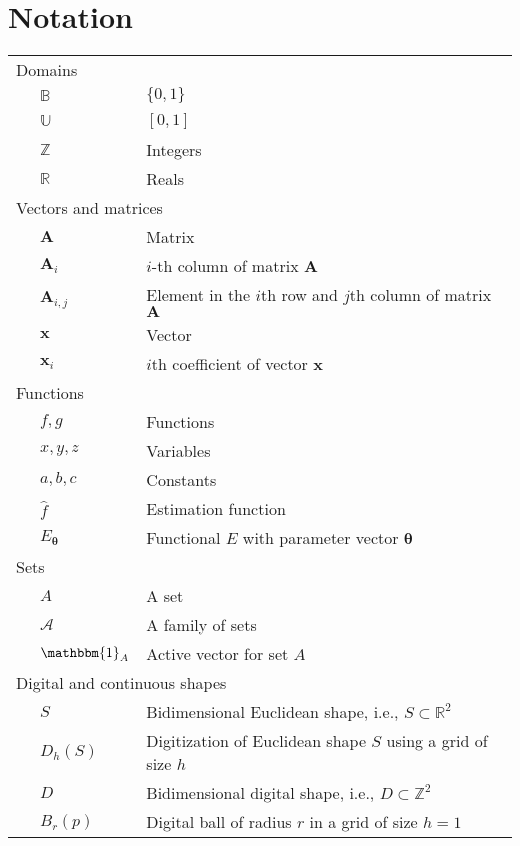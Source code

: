 \chapter{Notation}
\label{chapternotation}

\begin{longtable}{p{0.5cm}ll}
\multicolumn{3}{l}{Domains}\\
& $\mathbb{B}$ & $\{0,1\}$\\\
& $\mathbb{U}$ & $[0,1]$\\
& $\mathbb{Z}$ & Integers\\
& $\mathbb{R}$ & Reals\\[1em]

\multicolumn{3}{l}{Vectors and matrices}\\
& $\mathbf{A}$ & Matrix\\
& $\mathbf{A}_i$ & $i$-th column of matrix $\mathbf{A}$\\
& $\mathbf{A}_{i,j}$ & Element in the $i$th row and $j$th column of matrix $\mathbf{A}$\\
& $\mathbf{x}$ & Vector\\
& $\mathbf{x}_i$ & $i$th coefficient of vector $\mathbf{x}$\\[1em]

\multicolumn{3}{l}{Functions}\\
& $f,g$ & Functions\\
& $x,y,z$ & Variables \\
& $a,b,c$ & Constants \\
& $\hat{f}$ & Estimation function\\
& $E_{\boldsymbol{\theta}}$ & Functional $E$  with parameter vector $\boldsymbol{\theta}$ \\[1em]

\multicolumn{3}{l}{Sets}\\
& $A$ & A set\\
& $\mathcal{A}$ & A family of sets\\
& $\mathbbm{1}_A$ & Active vector for set $A$\\[1em]


\multicolumn{3}{l}{Digital and continuous shapes}\\
& $S$ & Bidimensional Euclidean shape, i.e.,  $S \subset \mathbb{R}^2$\\
& $D_h(S)$ & Digitization of Euclidean shape $S$  using a grid of size $h$\\
& $D$ & Bidimensional digital shape, i.e., $D \subset \mathbb{Z}^2$\\
& $B_r(p)$ & Digital ball of radius $r$  in a grid of size $h=1$ \\[1em]


\end{longtable}
